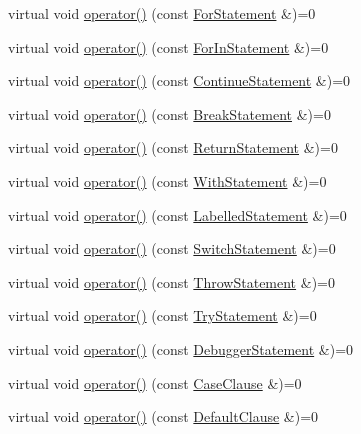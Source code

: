 \begin{DoxyCompactItemize}
\item 
virtual void \hyperlink{struct_visitor_a75180858faf5152f99742e4a19757928}{operator()} (const \hyperlink{struct_for_statement}{For\+Statement} \&)=0
\item 
virtual void \hyperlink{struct_visitor_af1c6c55ccfae8b2741e12168d81c45cb}{operator()} (const \hyperlink{struct_for_in_statement}{For\+In\+Statement} \&)=0
\item 
virtual void \hyperlink{struct_visitor_aca30136319d28baf708663a1d823af3a}{operator()} (const \hyperlink{struct_continue_statement}{Continue\+Statement} \&)=0
\item 
virtual void \hyperlink{struct_visitor_a19997436906171d41bec562d9cf260ef}{operator()} (const \hyperlink{struct_break_statement}{Break\+Statement} \&)=0
\item 
virtual void \hyperlink{struct_visitor_a041431785a00f9f387c7bc670b3ac660}{operator()} (const \hyperlink{struct_return_statement}{Return\+Statement} \&)=0
\item 
virtual void \hyperlink{struct_visitor_a16b17bbc1c01ed7ce1a0153b5c4c43a6}{operator()} (const \hyperlink{struct_with_statement}{With\+Statement} \&)=0
\item 
virtual void \hyperlink{struct_visitor_aea8fafb476b979172cc8a76ae511caff}{operator()} (const \hyperlink{struct_labelled_statement}{Labelled\+Statement} \&)=0
\item 
virtual void \hyperlink{struct_visitor_aadc852469aa4f7da11cc9f88084c63a8}{operator()} (const \hyperlink{struct_switch_statement}{Switch\+Statement} \&)=0
\item 
virtual void \hyperlink{struct_visitor_a806a67e34e7866e3af078b3c2b421a24}{operator()} (const \hyperlink{struct_throw_statement}{Throw\+Statement} \&)=0
\item 
virtual void \hyperlink{struct_visitor_af65bd8aa26745dea293f06d553d4f46f}{operator()} (const \hyperlink{struct_try_statement}{Try\+Statement} \&)=0
\item 
virtual void \hyperlink{struct_visitor_a7e091bee5a2d416aef22f9b1abd8c7ee}{operator()} (const \hyperlink{struct_debugger_statement}{Debugger\+Statement} \&)=0
\item 
virtual void \hyperlink{struct_visitor_acf85f394ddde782f9c08103055716d53}{operator()} (const \hyperlink{struct_case_clause}{Case\+Clause} \&)=0
\item 
virtual void \hyperlink{struct_visitor_adf82a6bdb4aad978d8ac6a3878a0d400}{operator()} (const \hyperlink{struct_default_clause}{Default\+Clause} \&)=0
\item 

\end{DoxyCompactItemize}
